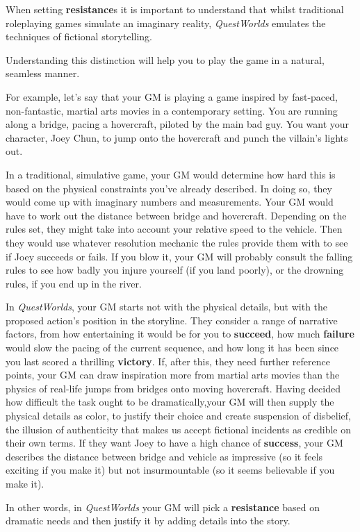 \documentclass[
]{article}
\begin{document}
When setting \textbf{resistance}s it is important to understand that
whilst traditional roleplaying games simulate an imaginary reality,
\emph{QuestWorlds} emulates the techniques of fictional storytelling.

Understanding this distinction will help you to play the game in a
natural, seamless manner.

For example, let's say that your GM is playing a game inspired by
fast-paced, non-fantastic, martial arts movies in a contemporary
setting. You are running along a bridge, pacing a hovercraft, piloted by
the main bad guy. You want your character, Joey Chun, to jump onto the
hovercraft and punch the villain's lights out.

In a traditional, simulative game, your GM would determine how hard this
is based on the physical constraints you've already described. In doing
so, they would come up with imaginary numbers and measurements. Your GM
would have to work out the distance between bridge and hovercraft.
Depending on the rules set, they might take into account your relative
speed to the vehicle. Then they would use whatever resolution mechanic
the rules provide them with to see if Joey succeeds or fails. If you
blow it, your GM will probably consult the falling rules to see how
badly you injure yourself (if you land poorly), or the drowning rules,
if you end up in the river.

In \emph{QuestWorlds}, your GM starts not with the physical details, but
with the proposed action's position in the storyline. They consider a
range of narrative factors, from how entertaining it would be for you to
\textbf{succeed}, how much \textbf{failure} would slow the pacing of the
current sequence, and how long it has been since you last scored a
thrilling \textbf{victory}. If, after this, they need further reference
points, your GM can draw inspiration more from martial arts movies than
the physics of real-life jumps from bridges onto moving hovercraft.
Having decided how difficult the task ought to be dramatically,your GM
will then supply the physical details as color, to justify their choice
and create suspension of disbelief, the illusion of authenticity that
makes us accept fictional incidents as credible on their own terms. If
they want Joey to have a high chance of \textbf{success}, your GM
describes the distance between bridge and vehicle as impressive (so it
feels exciting if you make it) but not insurmountable (so it seems
believable if you make it).

In other words, in \emph{QuestWorlds} your GM will pick a
\textbf{resistance} based on dramatic needs and then justify it by
adding details into the story.
\end{document}

